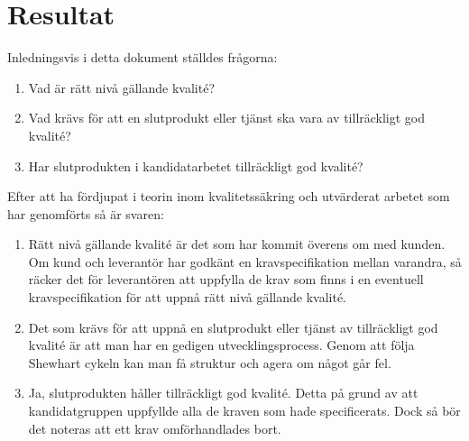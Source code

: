 \section{Resultat}
Inledningsvis i detta dokument ställdes frågorna:

\begin{enumerate}
  \item Vad är rätt nivå gällande kvalité?
  \item Vad krävs för att en slutprodukt eller tjänst ska vara av tillräckligt god kvalité?
  \item Har slutprodukten i kandidatarbetet tillräckligt god kvalité?
\end{enumerate}

\noindent Efter att ha fördjupat i teorin inom kvalitetssäkring och utvärderat arbetet som har genomförts så är svaren:

\begin{enumerate}
  \item Rätt nivå gällande kvalité är det som har kommit överens om med kunden. Om kund och leverantör har godkänt en kravspecifikation mellan varandra, så räcker det för leverantören att uppfylla de krav som finns i en eventuell kravspecifikation för att uppnå rätt nivå gällande kvalité.
  \item Det som krävs för att uppnå en slutprodukt eller tjänst av tillräckligt god kvalité är att man har en gedigen utvecklingsprocess. Genom att följa Shewhart cykeln kan man få struktur och agera om något går fel.  
  \item Ja, slutprodukten håller tillräckligt god kvalité. Detta på grund av att kandidatgruppen uppfyllde alla de kraven som hade specificerats. Dock så bör det noteras att ett krav omförhandlades bort.
\end{enumerate}